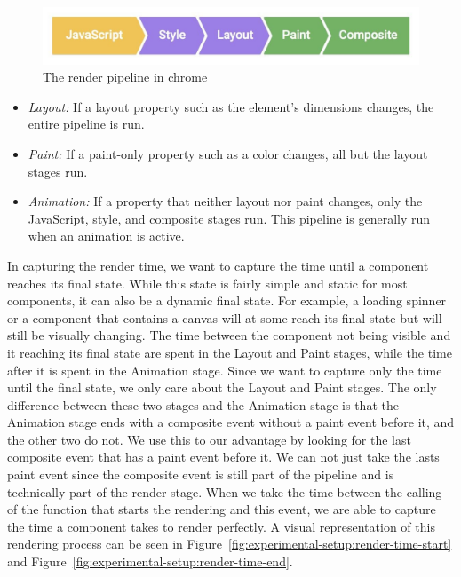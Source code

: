 \begin{figure}[h]
  \includegraphics[width=\columnwidth]{figures/experimental-setup/render-pipeline.jpg}
  \caption{The render pipeline in chrome}
  \label{fig:experimental-setup:pipeline}
  \centering
\end{figure}

\begin{itemize}
  \item \emph{Layout:} If a layout property such as the element's dimensions changes, the entire pipeline is run.
  \item \emph{Paint:} If a paint-only property such as a color changes, all but the layout stages run.
  \item \emph{Animation:} If a property that neither layout nor paint changes, only the JavaScript, style, and composite stages run. This pipeline is generally run when an animation is active.
\end{itemize}

In capturing the render time, we want to capture the time until a component reaches its final state. While this state is fairly simple and static for most components, it can also be a dynamic final state. For example, a loading spinner or a component that contains a canvas will at some reach its final state but will still be visually changing. The time between the component not being visible and it reaching its final state are spent in the Layout and Paint stages, while the time after it is spent in the Animation stage. Since we want to capture only the time until the final state, we only care about the Layout and Paint stages. The only difference between these two stages and the Animation stage is that the Animation stage ends with a composite event without a paint event before it, and the other two do not. We use this to our advantage by looking for the last composite event that has a paint event before it. We can not just take the lasts paint event since the composite event is still part of the pipeline and is technically part of the render stage. When we take the time between the calling of the function that starts the rendering and this event, we are able to capture the time a component takes to render perfectly. A visual representation of this rendering process can be seen in Figure~\ref{fig:experimental-setup:render-time-start} and Figure~\ref{fig:experimental-setup:render-time-end}.

